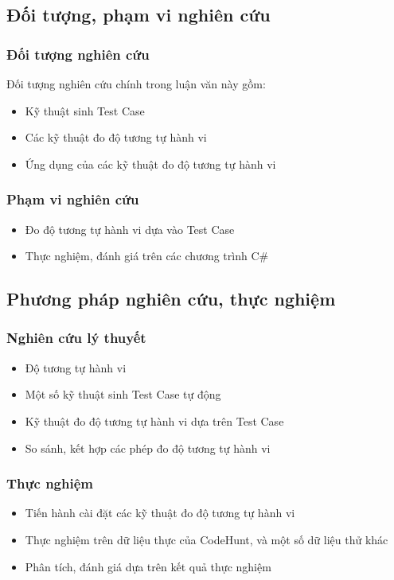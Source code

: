\subsection*{Đối tượng, phạm vi nghiên cứu}

\subsubsection*{Đối tượng nghiên cứu}

Đối tượng nghiên cứu chính trong luận văn này gồm:
\begin{itemize}
\item Kỹ thuật sinh Test Case
\item Các kỹ thuật đo độ tương tự hành vi
\item Ứng dụng của các kỹ thuật đo độ tương tự hành vi
\end{itemize}
	
\subsubsection*{Phạm vi nghiên cứu}
\begin{itemize}
\item Đo độ tương tự hành vi dựa vào Test Case
\item Thực nghiệm, đánh giá trên các chương trình C\#
\end{itemize}


\subsection*{Phương pháp nghiên cứu, thực nghiệm}
\subsubsection*{Nghiên cứu lý thuyết}
\begin{itemize}
\item Độ tương tự hành vi
\item Một số kỹ thuật sinh Test Case tự động
\item Kỹ thuật đo độ tương tự hành vi dựa trên Test Case
\item So sánh, kết hợp các phép đo độ tương tự hành vi
\end{itemize}
		
\subsubsection*{Thực nghiệm}
\begin{itemize}
\item Tiến hành cài đặt các kỹ thuật đo độ tương tự hành vi
\item Thực nghiệm trên dữ liệu thực của CodeHunt, và một số dữ liệu thử khác
\item Phân tích, đánh giá dựa trên kết quả thực nghiệm
\end{itemize}


